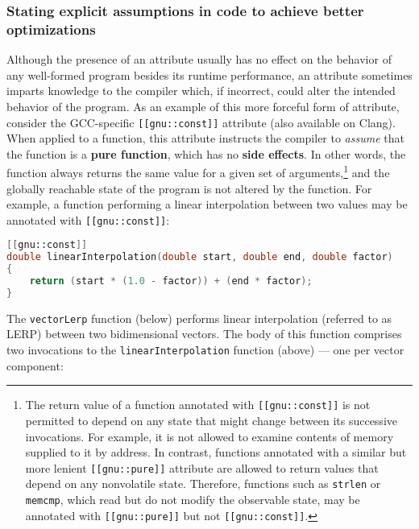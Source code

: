 \subsubsection[Stating explicit assumptions in code to achieve better optimizations]{Stating explicit assumptions in code to achieve better optimizations}\label{delineating-explicit-assumptions-in-code-to-achieve-better-optimizations}

Although the presence of an attribute usually has no effect
on the behavior of any well-formed program besides its runtime performance,
an attribute sometimes imparts knowledge to the compiler
which, if incorrect, could alter the intended behavior of the program. As an
example of this more forceful form of attribute, consider the
GCC-specific \texttt{[[gnu::const]]} attribute (also available on
Clang). When applied to a function, this attribute instructs the compiler to \emph{assume}
that the function is a \textbf{pure function}, which has no
\textbf{side effects}. In other words, the function always returns the same value for a given set of arguments,{\cprotect\footnote{The return value of a function annotated with \lstinline![[gnu::const]]! is not permitted to depend on any state that might change between its successive invocations. For example, it is not allowed to examine contents of memory supplied to it by address. In contrast, functions annotated with a similar but more lenient \lstinline![[gnu::pure]]! attribute are allowed to return values that depend on any nonvolatile state.  Therefore, functions such as \lstinline!strlen! or \lstinline!memcmp!, which read but do not modify the observable state, may be annotated with \lstinline![[gnu::pure]]! but not \lstinline![[gnu::const]]!.}} and the globally reachable state of the program is not altered by the function. For example, a function performing a linear interpolation between two values may be annotated with \lstinline![[gnu::const]]!:

\begin{lstlisting}[language=C++]
[[gnu::const]]
double linearInterpolation(double start, double end, double factor)
{
    return (start * (1.0 - factor)) + (end * factor);
}
\end{lstlisting}

\noindent The \texttt{vectorLerp} function (below) performs linear
interpolation (referred to as LERP) between two bidimen\-sional vectors. The body
of this function comprises two invocations to the
\mbox{\texttt{linearInterpolation}} function (above) --- one per vector
component:


